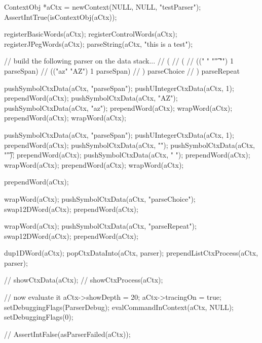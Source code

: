

\startCTest
  ContextObj *aCtx = newContext(NULL, NULL, "testParser");
  AssertIntTrue(isContextObj(aCtx));
  
  registerBasicWords(aCtx);
  registerControlWords(aCtx);
  registerJPegWords(aCtx);
  parseString(aCtx, "this is a test");

  // build the following parser on the data stack...
  // ( 
  //   (
  //     ((" " "\t" "\n") 1 parseSpan)
  //     (("az" "AZ") 1 parseSpan)
  //   ) parseChoice
  // ) parseRepeat

  pushSymbolCtxData(aCtx, "parseSpan");
  pushUIntegerCtxData(aCtx, 1);
  prependWord(aCtx);
  pushSymbolCtxData(aCtx, "AZ");
  pushSymbolCtxData(aCtx, "az");
  prependWord(aCtx);
  wrapWord(aCtx);
  prependWord(aCtx);
  wrapWord(aCtx);
  
  pushSymbolCtxData(aCtx, "parseSpan");
  pushUIntegerCtxData(aCtx, 1);
  prependWord(aCtx);
  pushSymbolCtxData(aCtx, "\n");
  pushSymbolCtxData(aCtx, "\t");
  prependWord(aCtx);
  pushSymbolCtxData(aCtx, " ");
  prependWord(aCtx);
  wrapWord(aCtx);
  prependWord(aCtx);
  wrapWord(aCtx);
  
  prependWord(aCtx);
  
  wrapWord(aCtx);
  pushSymbolCtxData(aCtx, "parseChoice");
  swap12DWord(aCtx);
  prependWord(aCtx);
  
  wrapWord(aCtx);
  pushSymbolCtxData(aCtx, "parseRepeat");
  swap12DWord(aCtx);
  prependWord(aCtx);
  
  dup1DWord(aCtx);
  popCtxDataInto(aCtx, parser);
  prependListCtxProcess(aCtx, parser);
  
//  showCtxData(aCtx);
//  showCtxProcess(aCtx);
  
  // now evaluate it
  aCtx->showDepth = 20;
  aCtx->tracingOn = true;
  setDebuggingFlags(ParserDebug);
  evalCommandInContext(aCtx, NULL);
  setDebuggingFlags(0);
  
//  AssertIntFalse(asParserFailed(aCtx));
\stopCTest
\stopTestCase
\stopTestSuite